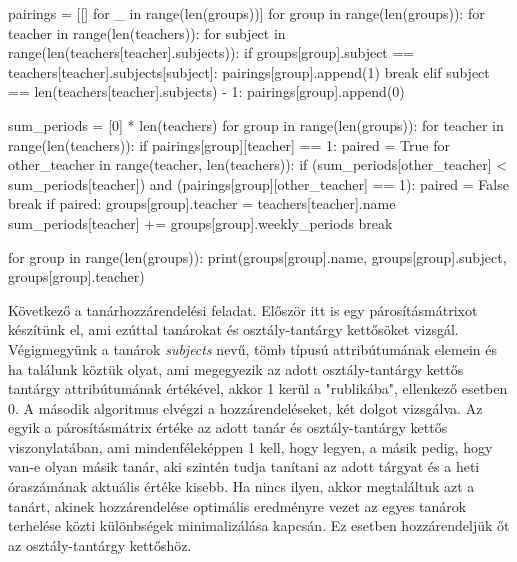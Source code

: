 \documentclass[a4paper,12pt]{article}
\begin{document}
\begin{python}
pairings = [[] for _ in range(len(groups))]
for group in range(len(groups)):
    for teacher in range(len(teachers)):
        for subject in range(len(teachers[teacher].subjects)):
            if groups[group].subject == teachers[teacher].subjects[subject]:
                pairings[group].append(1)
                break
            elif subject == len(teachers[teacher].subjects) - 1:
                pairings[group].append(0)

sum_periods = [0] * len(teachers)
for group in range(len(groups)):
    for teacher in range(len(teachers)):
        if pairings[group][teacher] == 1:
            paired = True
            for other_teacher in range(teacher, len(teachers)):
                if (sum_periods[other_teacher] < sum_periods[teacher]) and (pairings[group][other_teacher] == 1):
                    paired = False
                    break
            if paired:
                groups[group].teacher = teachers[teacher].name
                sum_periods[teacher] += groups[group].weekly_periods
                break

for group in range(len(groups)):
    print(groups[group].name, groups[group].subject, groups[group].teacher)
\end{python}

Következő a tanárhozzárendelési feladat. Először itt is egy párosításmátrixot készítünk el, ami ezúttal tanárokat és osztály-tantárgy kettősöket vizsgál. Végigmegyünk a tanárok \textsl{subjects} nevű, tömb típusú attribútumának elemein és ha találunk köztük olyat, ami megegyezik az adott osztály-tantárgy kettős tantárgy attribútumának értékével, akkor 1 kerül a "rublikába", ellenkező esetben 0.
A második algoritmus elvégzi a hozzárendeléseket, két dolgot vizsgálva. Az egyik a párosításmátrix értéke az adott tanár és osztály-tantárgy kettős viszonylatában, ami mindenféleképpen 1 kell, hogy legyen, a másik pedig, hogy van-e olyan másik tanár, aki szintén tudja tanítani az adott tárgyat és a heti óraszámának aktuális értéke kisebb. Ha nincs ilyen, akkor megtaláltuk azt a tanárt, akinek hozzárendelése optimális eredményre vezet az egyes tanárok terhelése közti különbségek minimalizálása kapcsán. Ez esetben hozzárendeljük őt az osztály-tantárgy kettőshöz.
\end{document}
